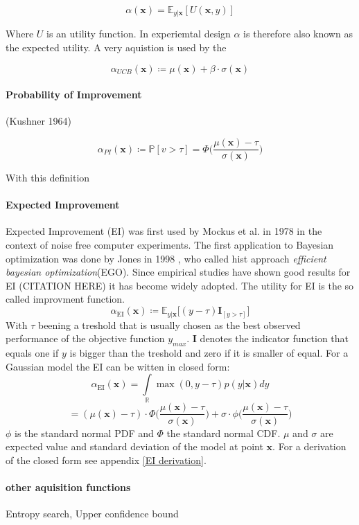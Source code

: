 \documentclass[english]{article}
\newcommand{\EI}{\operatorname{EI}}
\newcommand{\x}{\mathbf{x}}
\newcommand{\E}{\mathbb{E}}
\begin{document}
$$\alpha(\x) = \E_{y|\x}[U(\x,y)]$$

Where $U$ is an utility function. In experiemtal design $\alpha$ is therefore also known as the expected utility.
A very aquistion is used by the

$$\alpha_{UCB}(\x) \coloneqq \mu(\x) + \beta \cdot \sigma(\x) $$

\paragraph{Probability of Improvement}

(Kushner 1964)

$$
\alpha_{PI}(\x) \coloneqq \mathbb{P}[v>\tau] = \Phi\bigg(\frac{\mu(\x)-\tau}{\sigma(\x)}\bigg)
$$

With this definition

\paragraph{Expected Improvement}
Expected Improvement (EI) was first used by Mockus et al. in 1978 \cite{mockus_application_1978} in the context of noise free computer experiments. The first application to Bayesian optimization was done by Jones in 1998 \cite{jones_efficient_1998}, who called hist approach \textit{efficient bayesian optimization}(EGO). Since empirical studies have shown good results for EI (CITATION HERE) it has become widely adopted. The utility for EI is the so called improvment function.
$$\alpha_{\EI}(\x) \coloneqq \E_{y|\x}\big[(y - \tau)\mathbf{I}_{[y > \tau]}\big]$$
With $\tau$ beening a treshold that is usually chosen as the best observed performance of the objective function $y_{max}$. $\mathbf{I}$ denotes the indicator function that equals one if $y$ is bigger than the treshold and zero if it is smaller of equal. For a Gaussian model the EI can be witten in closed form:
$$ \alpha_{\EI}(\x) = \int\limits_{\mathbb{R}} \max(0, y-\tau)p(y|\x)dy$$
$$= (\mu(\x) - \tau) \cdot \Phi \bigg(\frac{\mu(\x)-\tau}{\sigma(\x)}\bigg) + \sigma \cdot \phi \bigg(\frac{\mu(\x)-\tau}{\sigma(\x)}\bigg)$$
$\phi$ is the standard normal PDF and $\Phi$ the standard normal CDF. $\mu$ and $\sigma$ are expected value and standard deviation of the model at point $\x$.
For a derivation of the closed form see appendix \ref{EI derivation}.

\paragraph{other aquisition functions}
Entropy search, Upper confidence bound
\end{document}
